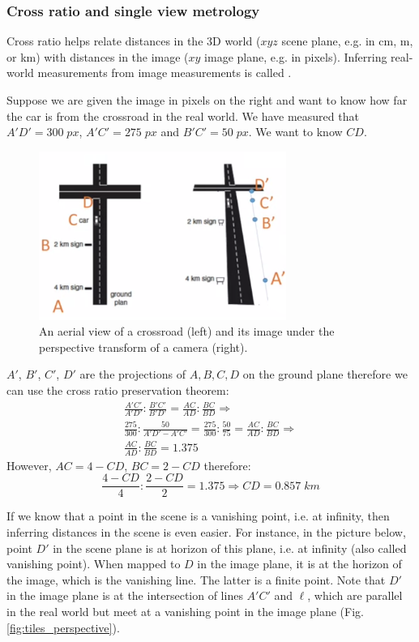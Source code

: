 \documentclass[a4paper]{article}
\begin{document}
\subsubsection{Cross ratio and single view metrology}

Cross ratio helps relate distances in the 3D world ($xyz$ scene plane, e.g. in cm, m, or km) with distances in the image ($xy$ image plane, e.g. in pixels). Inferring real-world measurements from image measurements is called .

Suppose we are given the image in pixels on the right and want to know how far the car is from the crossroad in the real world. We have measured that $A'D'=300\; px$, $A'C'=275 \; px$ and $B'C'=50\; px$. We want to know $CD$.
\begin{figure}[H]
    \centering
    \includegraphics[height=5.5cm]{img/cross_ratio_crossroad.png}
    \caption{An aerial view of a crossroad (left) and its image under the perspective transform of a camera (right).}
    \label{fig:my_label}
\end{figure}
$A'$, $B'$, $C'$, $D'$ are the projections of $A,B,C,D$ on the ground plane therefore we can use the cross ratio preservation theorem:
\begin{gather*}
\frac{A'C'}{A'D'}:\frac{B'C'}{B'D'} = \frac{AC}{AD}:\frac{BC}{BD} \Rightarrow\\
\frac{275}{300}:\frac{50}{A'D' - A'C'} = \frac{275}{300}:\frac{50}{75} = \frac{AC}{AD}:\frac{BC}{BD}  \Rightarrow \\
\frac{AC}{AD}:\frac{BC}{BD} =1.375
\end{gather*}
However, $AC=4-CD$, $BC=2-CD$ therefore:
\[
\frac{4-CD}{4}:\frac{2-CD}{2} = 1.375 \Rightarrow CD = 0.857 \; km
\]

If we know that  a point in the scene is a vanishing point, i.e. at infinity, then inferring distances in the scene is even easier. For instance, in the picture below, point $D'$ in the scene plane is at horizon of this plane, i.e. at infinity (also called vanishing point). When mapped to $D$ in the image plane, it is at the horizon of the image, which is the vanishing line. The latter is a finite point. Note that $D'$ in the image plane is at the intersection of lines $A'C'$ and $\ell$, which are parallel in the real world but meet at a vanishing point in the image plane (Fig. \ref{fig:tiles_perspective}).
\end{document}
